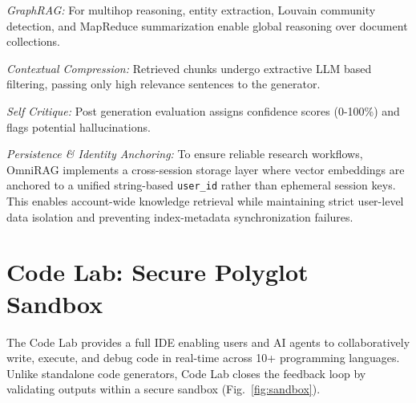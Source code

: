 \documentclass[conference]{IEEEtran}
\begin{document}
\textit{GraphRAG:} For multihop reasoning, entity extraction, Louvain community detection, and MapReduce summarization enable global reasoning over document collections.

\textit{Contextual Compression:} Retrieved chunks undergo extractive LLM based filtering, passing only high relevance sentences to the generator.

\textit{Self Critique:} Post generation evaluation assigns confidence scores (0-100\%) and flags potential hallucinations.

\textit{Persistence \& Identity Anchoring:} To ensure reliable research workflows, OmniRAG implements a cross-session storage layer where vector embeddings are anchored to a unified string-based \texttt{user\_id} rather than ephemeral session keys. This enables account-wide knowledge retrieval while maintaining strict user-level data isolation and preventing index-metadata synchronization failures.


\section{Code Lab: Secure Polyglot Sandbox}

The Code Lab provides a full IDE enabling users and AI agents to collaboratively write, execute, and debug code in real-time across 10+ programming languages. Unlike standalone code generators, Code Lab closes the feedback loop by validating outputs within a secure sandbox (Fig.~\ref{fig:sandbox}).
\end{document}
